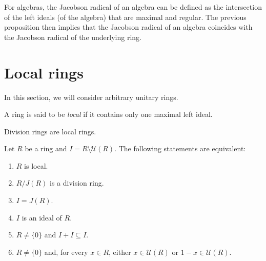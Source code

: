For algebras, the Jacobson radical of an 
algebra can be defined as 
the intersection of the left ideals (of the algebra) 
that are maximal and regular. The previous 
proposition then implies that the Jacobson radical of an algebra coincides
with the Jacobson radical of the underlying ring. 



\section{Local rings}

In this section, we will consider arbitrary unitary rings. 

\begin{definition}
    A ring is said to be \emph{local} if it contains only one maximal left ideal. 
\end{definition}

Division rings are local rings. 


\begin{theorem}
\label{thm:local}
    Let $R$ be a ring and $I=R\setminus\mathcal{U}(R)$. The following
    statements are equivalent:
    \begin{enumerate}
        \item $R$ is local.
        \item $R/J(R)$ is a division ring.
        \item $I=J(R)$.
        \item $I$ is an ideal of $R$.
        \item $R\ne\{0\}$ and $I+I\subseteq I$.
        \item $R\ne\{0\}$ and, for every $x\in R$, either $x\in\mathcal{U}(R)$ or $1-x\in\mathcal{U}(R)$.
    \end{enumerate}
\end{theorem}

